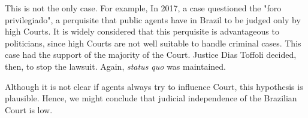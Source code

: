 \documentclass[12pt, a4paper]{article}
\begin{document}
This is not the only case. For example, In 2017, a case questioned the "foro privilegiado", a perquisite that public agents have in Brazil to be judged only by high Courts. It is widely considered that this perquisite is advantageous to politicians, since high Courts are not well suitable to handle criminal cases. This case had the support of the majority of the Court. Justice Dias Toffoli decided, then, to stop the lawsuit. Again, \textit{status quo} was maintained. 

Although it is not clear if agents always try to influence Court, this hypothesis is plausible. Hence, we might conclude that judicial independence of the Brazilian Court is low. 





\end{document}
